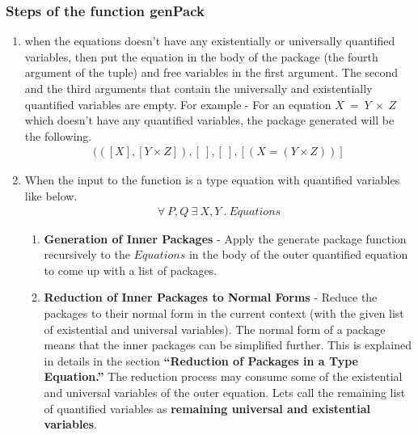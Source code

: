 \documentclass[11pt]{article}
\begin{document}
\subsubsection {Steps of the function genPack}
\begin{enumerate}
     \setlength\itemsep {1em}
    \item when the equations doesn't have any existentially or universally quantified variables, then put the equation in the body of the package (the fourth argument of the tuple) and free variables in the first argument. The second and the third arguments that contain the universally and existentially quantified variables are empty. For example - For an equation 
    $X ~ = ~ Y~ \times ~Z $ which doesn't have any quantified variables, the package generated will be the following. 
            \begin{align*}
                  (([X],[Y \times Z]),[~],[~],[(X = (Y \times Z))]
            \end{align*}
    \item When the input to the function is a type equation with quantified variables like below.
    \begin{align*}
       \forall~P,Q ~\exists~X,Y~.~Equations     
    \end{align*} 
    \begin{enumerate}
         \setlength\itemsep {1em}
        \item {\bf Generation of Inner Packages} - Apply the generate package function recursively to the $Equations$ in the body of the outer quantified equation to come up with a list of packages.
        
        \item {\bf Reduction of Inner Packages to Normal Forms} -
         Reduce the packages to their normal form in the current context (with the given list of existential and universal variables). The normal form of a package means that the inner packages can be simplified further. This is explained in details in the section {\bf ``Reduction of Packages in a Type Equation.''} The reduction process may consume some of the existential and universal variables of the outer equation. Lets call the remaining list of quantified variables as {\bf remaining universal and existential variables}.
        

\end{enumerate}
\end{enumerate}
\end{document}
